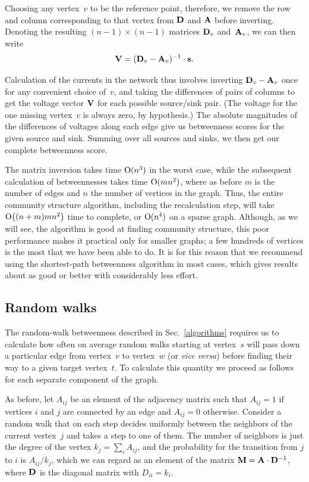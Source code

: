 \documentclass[twocolumn,pre,superscriptaddress]{revtex4}
\begin{document}
Choosing any vertex~$v$ to be the reference point, therefore, we remove the
row and column corresponding to that vertex from $\mathbf{D}$ and $\mathbf{A}$ before
inverting.  Denoting the resulting $(n-1)\times(n-1)$ matrices $\mathbf{D}_v$
and~$\mathbf{A}_v$, we can then write
\begin{equation}
\mathbf{V} = (\mathbf{D}_v-\mathbf{A}_v)^{-1}\cdot\mathbf{s}.
\end{equation}

Calculation of the currents in the network thus involves inverting
$\mathbf{D}_v-\mathbf{A}_v$ once for any convenient choice of~$v$, and taking the
differences of pairs of columns to get the voltage vector $\mathbf{V}$ for each
possible source/sink pair.  (The voltage for the one missing vertex~$v$ is
always zero, by hypothesis.)  The absolute magnitudes of the differences of
voltages along each edge give us betweenness scores for the given source
and sink.  Summing over all sources and sinks, we then get our complete
betweenness score.

The matrix inversion takes time $\mathrm{O}(n^3)$ in the worst case, while the
subsequent calculation of betweennesses takes time $\mathrm{O}(mn^2)$, where as
before $m$ is the number of edges and $n$ the number of vertices in the
graph.  Thus, the entire community structure algorithm, including the
recalculation step, will take $\mathrm{O}\bigl((n+m)mn^2\bigr)$ time to complete,
or $\mathrm{O}(n^4)$ on a sparse graph.  Although, as we will see, the algorithm is
good at finding community structure, this poor performance makes it
practical only for smaller graphs; a few hundreds of vertices is the most
that we have been able to do.  It is for this reason that we recommend
using the shortest-path betweenness algorithm in most cases, which gives
results about as good or better with considerably less effort.


\subsection{Random walks}
\label{rw}
The random-walk betweenness described in Sec.~\ref{algorithms} requires us
to calculate how often on average random walks starting at vertex~$s$ will
pass down a particular edge from vertex~$v$ to vertex~$w$ (or \textit{vice
versa}) before finding their way to a given target vertex~$t$.  To
calculate this quantity we proceed as follows for each separate component
of the graph.

As before, let $A_{ij}$ be an element of the adjacency matrix such that
$A_{ij}=1$ if vertices $i$ and $j$ are connected by an edge and $A_{ij}=0$
otherwise.  Consider a random walk that on each step decides uniformly
between the neighbors of the current vertex~$j$ and takes a step to one of
them.  The number of neighbors is just the degree of the vertex $k_j=\sum_i
A_{ij}$, and the probability for the transition from $j$ to $i$ is
$A_{ij}/k_j$, which we can regard as an element of the matrix
$\mathbf{M}=\mathbf{A}\cdot\mathbf{D}^{-1}$, where $\mathbf{D}$ is the diagonal matrix with
$D_{ii}=k_i$.
\end{document}
